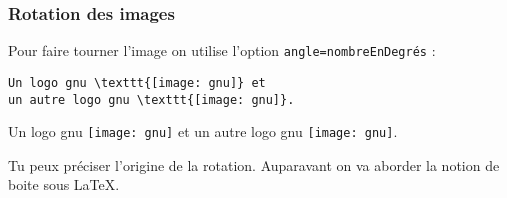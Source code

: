 \documentclass[10pt,hyperref={pdfpagemode=FullScreen},xcolor=dvipsnames,xcolor=table, xcolor=svgnames]{beamer}%
\newcommand{\latex}{\LaTeX\xspace}
\begin{document}
 \begin{frame}[fragile]
   \frametitle{Rotation des images}
Pour faire tourner l'image on utilise l'option {\color{blue}\verb!angle=nombreEnDegrés!} :
\begin{exampleblock}{}
\begin{verbatim}
Un logo gnu \texttt{[image: gnu]} et
un autre logo gnu \texttt{[image: gnu]}.
\end{verbatim}
\end{exampleblock}
\begin{block}{}
Un logo gnu \texttt{[image: gnu]} et
un autre logo gnu \texttt{[image: gnu]}.
\end{block}
Tu peux préciser l'origine de la rotation. Auparavant on va aborder la notion de boite sous \latex.
\end{frame}
\end{document}
